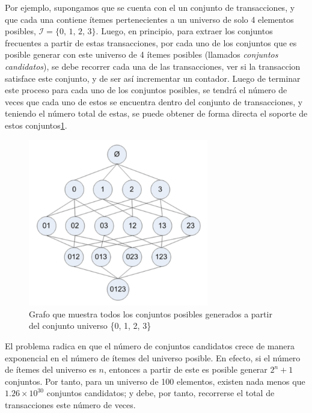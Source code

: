 Por ejemplo, supongamos que se cuenta con el un conjunto de transacciones, y que cada una contiene ítemes pertenecientes a un universo de solo 4 elementos posibles, $\mathcal{I} = \{0,\,1,\,2,\,3\}$. Luego, en principio, para extraer los conjuntos frecuentes a partir de estas transacciones, por cada uno de los conjuntos que es posible generar con este universo de 4 ítemes posibles (llamados \textit{conjuntos candidatos}), se debe recorrer cada una de las transacciones, ver si la transaccion satisface este conjunto, y de ser así incrementar un contador. Luego de terminar este proceso para cada uno de los conjuntos posibles, se tendrá el número de veces que cada uno de estos se encuentra dentro del conjunto de transacciones, y teniendo el número total de estas, se puede obtener de forma directa el soporte de estos conjuntos\ref{fig:possible_itemsets}.

\begin{figure}[h!]
\begin{center}
\includegraphics[width=0.7\textwidth]{imagenes/possible_itemsets.png}
\end{center}
\vspace*{-5mm}
\caption{Grafo que muestra todos los conjuntos posibles generados a partir del conjunto universo \{0, 1, 2, 3\}\cite{harrington2012machine}}
\label{fig:possible_itemsets}
\end{figure}

El problema radica en que el número de conjuntos candidatos crece de manera exponencial en el número de ítemes del universo posible. En efecto, si el número de ítemes del universo es $n$, entonces a partir de este es posible generar $2^n+1$ conjuntos. Por tanto, para un universo de 100 elementos, existen nada menos que $1.26\times10^{30}$ conjuntos candidatos; y debe, por tanto, recorrerse el total de transacciones este número de veces.

